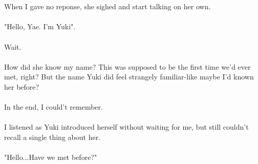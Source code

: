 \documentclass[10pt,a4paper]{article}
\begin{document}
\\
\\
When I gave no reponse, she sighed and start talking on her own.
\\
\\
"Hello, Yae. I'm Yuki".
\\
\\
Wait.
\\
\\
How did she know my name? This was supposed to be the first time we'd ever met, right? But the name Yuki did feel strangely familiar-like maybe I'd known her before?
\\
\\
In the end, I could't remember.
\\
\\
I listened as Yuki introduced herself without waiting for me, but still couldn't recall a single thing about her.
\\
\\
"Hello...Have we met before?"
\end{document}
